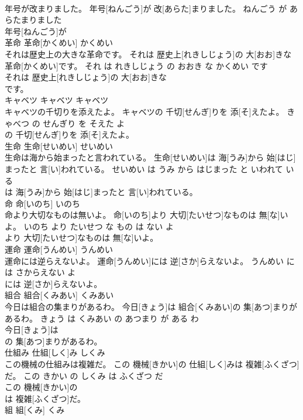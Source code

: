 \documentclass[8pt]{extreport}
\begin{document}
\begin{CJK}{UTF8}{min}
\\	年号が改まりました。	年号[ねんごう]が 改[あらた]まりました。	ねんごう が あらたまりました	
\\	年号[ねんごう]が
\\	革命	革命[かくめい]	かくめい	
\\	それは歴史上の大きな革命です。	それは 歴史上[れきしじょう]の 大[おお]きな 革命[かくめい]です。	それ は れきしじょう の おおき な かくめい です	
\\	それは 歴史上[れきしじょう]の 大[おお]きな
\\	です。			
\\	キャベツ	キャベツ	キャベツ	
\\	キャベツの千切りを添えたよ。	キャベツの 千切[せんぎ]りを 添[そ]えたよ。	きゃべつ の せんぎり を そえた よ	
\\	の 千切[せんぎ]りを 添[そ]えたよ。			
\\	生命	生命[せいめい]	せいめい	
\\	生命は海から始まったと言われている。	生命[せいめい]は 海[うみ]から 始[はじ]まったと 言[い]われている。	せいめい は うみ から はじまった と いわれて いる	
\\	は 海[うみ]から 始[はじ]まったと 言[い]われている。			
\\	命	命[いのち]	いのち	
\\	命より大切なものは無いよ。	命[いのち]より 大切[たいせつ]なものは 無[な]いよ。	いのち より たいせつ な もの は ない よ	
\\	より 大切[たいせつ]なものは 無[な]いよ。			
\\	運命	運命[うんめい]	うんめい	
\\	運命には逆らえないよ。	運命[うんめい]には 逆[さか]らえないよ。	うんめい に は さからえない よ	
\\	には 逆[さか]らえないよ。			
\\	組合	組合[くみあい]	くみあい	
\\	今日は組合の集まりがあるわ。	今日[きょう]は 組合[くみあい]の 集[あつ]まりがあるわ。	きょう は くみあい の あつまり が ある わ	
\\	今日[きょう]は
\\	の 集[あつ]まりがあるわ。			
\\	仕組み	仕組[しく]み	しくみ	
\\	この機械の仕組みは複雑だ。	この 機械[きかい]の 仕組[しく]みは 複雑[ふくざつ]だ。	この きかい の しくみ は ふくざつ だ	
\\	この 機械[きかい]の
\\	は 複雑[ふくざつ]だ。			
\\	組	組[くみ]	くみ	

\end{CJK}
\end{document}
